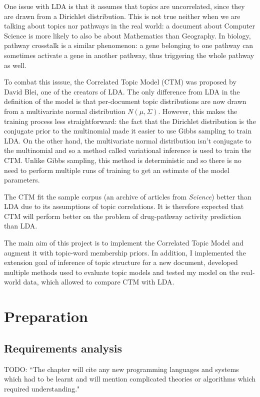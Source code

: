 \documentclass[12pt,a4paper,twoside,openright]{report}
\begin{document}
One issue with LDA is that it assumes that topics are uncorrelated, since they are drawn from a Dirichlet distribution. This is not true neither when we are talking about topics nor pathways in the real world: a document about Computer Science is more likely to also be about Mathematics than Geography. In biology, pathway crosstalk is a similar phenomenon: a gene belonging to one pathway can sometimes activate a gene in another pathway, thus triggering the whole pathway as well.

To combat this isssue, the Correlated Topic Model (CTM) \cite{2007} was proposed by David Blei, one of the creators of LDA. The only difference from LDA in the definition of the model is that per-document topic distributions are now drawn from a multivariate normal distribution $N(\mu, \Sigma)$. However, this makes the training process less straightforward: the fact that the Dirichlet distribution is the conjugate prior to the multinomial made it easier to use Gibbs sampling to train LDA. On the other hand, the multivariate normal distribution isn't conjugate to the multinomial and so a method called variational inference is used to train the CTM. Unlike Gibbs sampling, this method is deterministic and so there is no need to perform multiple runs of training to get an estimate of the model parameters.

The CTM fit the sample corpus (an archive of articles from \textit{Science}) better than LDA due to its assumptions of topic correlations. It is therefore expected that CTM will perform better on the problem of drug-pathway activity prediction than LDA.

The main aim of this project is to implement the Correlated Topic Model and augment it with topic-word membership priors. In addition, I implemented the extension goal of inference of topic structure for a new document, developed multiple methods used to evaluate topic models and tested my model on the real-world data, which allowed to compare CTM with LDA.

\chapter{Preparation}

\section{Requirements analysis}

TODO: ``The chapter will cite any new programming languages and systems which had to be learnt and will mention complicated theories or algorithms which required understanding."
\end{document}
